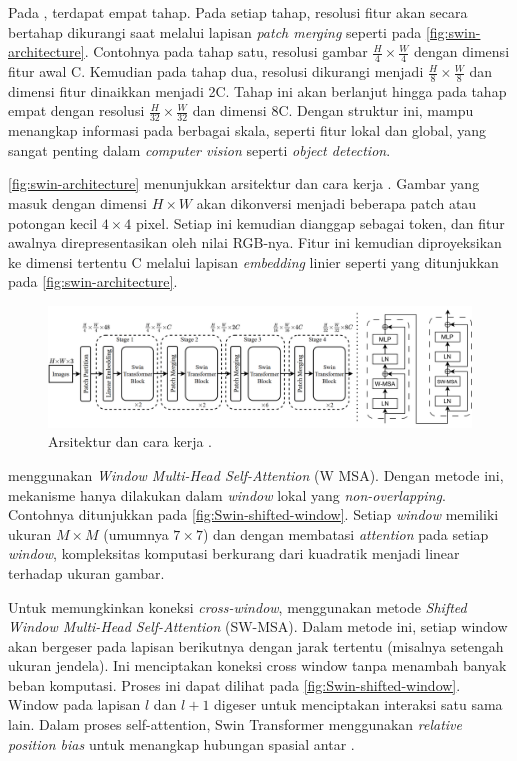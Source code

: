 Pada \swin, terdapat empat tahap. Pada setiap tahap, resolusi fitur akan secara bertahap dikurangi saat melalui lapisan \emph{patch merging} seperti pada \autoref{fig:swin-architecture}. Contohnya pada tahap satu, resolusi gambar $\frac{H}{4} \times \frac{W}{4}$ dengan dimensi fitur awal C. Kemudian pada tahap dua, resolusi dikurangi menjadi $\frac{H}{8} \times \frac{W}{8}$ dan 
dimensi fitur dinaikkan menjadi 2C. Tahap ini akan berlanjut hingga pada tahap empat dengan resolusi $\frac{H}{32} \times \frac{W}{32}$ dan dimensi 8C. Dengan struktur ini, \swin{} mampu menangkap informasi pada berbagai skala, seperti fitur lokal 
dan global, yang sangat penting dalam \emph{computer vision} seperti \emph{object detection}. 

\autoref{fig:swin-architecture} menunjukkan arsitektur dan cara kerja \swin. Gambar yang masuk dengan dimensi $H \times W$ akan dikonversi menjadi beberapa patch atau potongan kecil $4 \times 4$ pixel. Setiap \patch{} ini kemudian dianggap sebagai token, dan fitur awalnya direpresentasikan oleh nilai RGB-nya. Fitur ini kemudian 
diproyeksikan ke dimensi tertentu C melalui lapisan \emph{embedding} linier seperti yang ditunjukkan pada \autoref{fig:swin-architecture}.

\begin{figure}[htbp]
    \centering
    \includegraphics[width=1\textwidth]{images/swin-architecture.png}
    \caption{Arsitektur dan cara kerja \swin{} \parencite{liu2021swin}.}
    \label{fig:swin-architecture}
\end{figure}

\swin{} menggunakan \emph{Window Multi-Head Self-Attention} (W
MSA). Dengan metode ini, mekanisme \selfattention{} hanya dilakukan dalam \emph{window} lokal yang \emph{non-overlapping}. Contohnya ditunjukkan pada \autoref{fig:Swin-shifted-window}. 
Setiap \emph{window} memiliki ukuran $M \times M$ (umumnya $7 \times 7$) dan dengan membatasi \emph{attention} pada setiap \emph{window}, kompleksitas komputasi berkurang dari kuadratik menjadi linear terhadap ukuran gambar.

Untuk memungkinkan koneksi \emph{cross-window}, \swin{} 
menggunakan metode \emph{Shifted Window Multi-Head Self-Attention} (SW-MSA). 
Dalam metode ini, setiap window akan bergeser pada lapisan berikutnya dengan jarak tertentu (misalnya setengah ukuran jendela). Ini menciptakan koneksi cross window tanpa menambah banyak beban komputasi. Proses ini dapat dilihat pada \autoref{fig:Swin-shifted-window}. Window pada lapisan $l$ dan $l+1$ digeser untuk menciptakan interaksi 
satu sama lain. Dalam proses self-attention, Swin Transformer menggunakan \textit{relative position bias} untuk menangkap hubungan spasial antar \patch{}.
